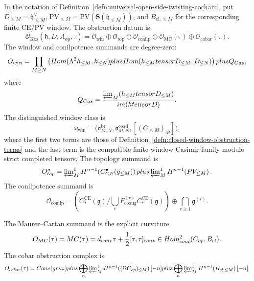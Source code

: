 \begin{defn}
\label{defn:universal-koszul-obstruction-complex}
  In the notation of
  Definition~\ref{defn:universal-open-side-twisting-cochain}, put
  \(D_{\leq M}=\mathfrak h_{\leq M}^\vee\),
  \(\mathrm{PV}_{\leq M}=\mathrm{PV}(\mathbf S(\mathfrak h_{\leq M}))\),
  and \(B_{\mathrm{cl},\leq M}\) for the corresponding finite CE/PV
  window.  The obstruction datum is
  \[
    \mathcal O_{\mathrm{Kos}}(\mathfrak h,D,A_{\mathrm{op}},\tau)
      =
      \mathcal O_{\mathrm{win}}
      \oplus
      \mathcal O_{\mathrm{top}}
      \oplus
      \mathcal O_{\mathrm{conilp}}
      \oplus
      \mathcal O_{\mathrm{MC}}(\tau)
      \oplus
      \mathcal O_{\mathrm{cobar}}(\tau).
  \]
  The window and conilpotence summands are degree-zero:
  \[
    \mathcal O_{\mathrm{win}}
      =
      \prod_{M\geq N}
      \left(
        \Hom(\Lambda^2\mathfrak h_{\leq M},\mathfrak h_{\leq N})
        \oplus
        \Hom(\mathfrak h_{\leq M}\otimes D_{\leq M},D_{\leq N})
      \right)
      \oplus
      Q_{\mathrm{Cas}},
  \]
  where
  \[
    Q_{\mathrm{Cas}}
      =
      \frac{\varprojlim_M(\mathfrak h_{\leq M}\otimes D_{\leq M})}
           {\operatorname{im}(\mathfrak h\widehat\otimes D)} .
  \]
  The distinguished window class is
  \[
    \omega_{\mathrm{win}}
      =
      \bigl(
        \mathfrak o^{\mathrm{br}}_{M,N},
        \mathfrak o^{\mathrm{coad}}_{M,N},
        [(C_{\leq M})_M]
      \bigr),
  \]
  where the first two terms are those of
  Definition~\ref{defn:closed-window-obstruction-terms} and the last
  term is the compatible finite-window Casimir family modulo strict
  completed tensors.  The topology summand is
  \[
    \mathcal O_{\mathrm{top}}^n
      =
      \varprojlim\nolimits^1_M
        H^{n-1}\!\left(C^\bullet_{\mathrm{CE}}(\mathfrak g_{\leq M})\right)
      \oplus
      \varprojlim\nolimits^1_M
        H^{n-1}\!\left(\mathrm{PV}_{\leq M}\right).
  \]
  The conilpotence summand is
  \[
    \mathcal O_{\mathrm{conilp}}
      =
      \left(
        C_*^{\mathrm{CE}}(\mathfrak g)/
        \bigcup_rF^{(r)}_{\mathrm{coaug}}
          C_*^{\mathrm{CE}}(\mathfrak g)
      \right)
      \oplus
      \bigcap_{r\geq1}\mathfrak g^{(r)}.
  \]

  The Maurer--Cartan summand is the explicit curvature
  \[
    \mathcal O_{\mathrm{MC}}(\tau)
      =
      \operatorname{MC}(\tau)
      =
      d_{\mathrm{conv}}\tau+\frac12[\tau,\tau]_{\mathrm{conv}}
      \in
      \Hom^2_{\mathrm{cont}}(C_{\mathrm{op}},B_{\mathrm{cl}}).
  \]
  The cobar obstruction complex is
  \[
    \mathcal O_{\mathrm{cobar}}(\tau)
      =
      \operatorname{Cone}(\operatorname{gr}\kappa_\tau)
      \oplus
      \bigoplus_n
      \varprojlim\nolimits^1_M
        H^{n-1}\!\left((\Omega C_{\mathrm{op}})_{\leq M}\right)[-n]
      \oplus
      \bigoplus_n
      \varprojlim\nolimits^1_M
        H^{n-1}\!\left(B_{\mathrm{cl},\leq M}\right)[-n].
  \]
\end{defn}

